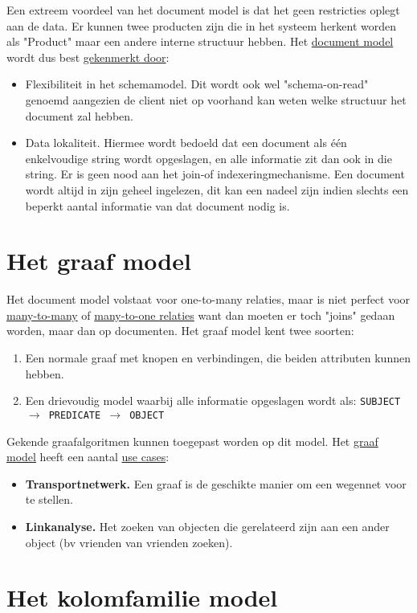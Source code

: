 \documentclass{report}
\begin{document}
	Een extreem voordeel van het document model is dat het geen restricties oplegt aan de data. Er kunnen twee producten zijn die in het systeem herkent worden als "Product" maar een andere interne structuur hebben. Het \underline{document model} wordt dus best \underline{gekenmerkt door}:
	\begin{itemize}
		\item Flexibiliteit in het schemamodel. Dit wordt ook wel "schema-on-read" genoemd aangezien de client niet op voorhand kan weten welke structuur het document zal hebben.
		\item Data lokaliteit. Hiermee wordt bedoeld dat een document als één enkelvoudige string wordt opgeslagen, en alle informatie zit dan ook in die string. Er is geen nood aan het join-of indexeringmechanisme. Een document wordt altijd in zijn geheel ingelezen, dit kan een nadeel zijn indien slechts een beperkt aantal informatie van dat document nodig is.
	\end{itemize}

	\section{Het graaf model}
	Het document model volstaat voor one-to-many relaties, maar is niet perfect voor \underline{many-to-many} of \underline{many-to-one relaties} want dan moeten er toch "joins" gedaan worden, maar dan op documenten. Het graaf model kent twee soorten:
	\begin{enumerate}
		\item Een normale graaf met knopen en verbindingen, die beiden attributen kunnen hebben.
		\item Een drievoudig model waarbij alle informatie opgeslagen wordt als: \texttt{SUBJECT $\rightarrow$ PREDICATE $\rightarrow$ OBJECT}
	\end{enumerate}
	Gekende graafalgoritmen kunnen toegepast worden op dit model. Het \underline{graaf model} heeft een aantal \underline{use cases}:
	\begin{itemize}
		\item \textbf{Transportnetwerk.} Een graaf is de geschikte manier om een wegennet voor te stellen.
		\item \textbf{Linkanalyse.} Het zoeken van objecten die gerelateerd zijn aan een ander object (bv vrienden van vrienden zoeken).
	\end{itemize}

	\section{Het kolomfamilie model}
\end{document}
